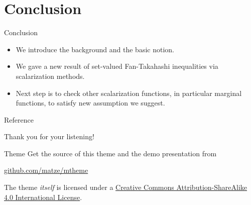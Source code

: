 \documentclass[aspectratio=169, dvipdfmx, 11pt]{beamer}
\begin{document}
\section{Conclusion}

\begin{frame}{Conclusion}
  \begin{itemize}
    \item We introduce the background and the basic notion.
    \item We gave a new result of set-valued Fan-Takahashi inequalities via scalarization methods.
    \item Next step is to check other scalarization functions, in particular marginal functions,
          to satisfy new assumption we suggest.
  \end{itemize}
\end{frame}

\begin{frame}[allowframebreaks]{Reference}
  \printbibliography
\end{frame}

\begin{frame}
  Thank you for your listening!
\end{frame}

\begin{frame}[noframenumbering]{Theme}
  Get the source of this theme and the demo presentation from

  \begin{center}\url{github.com/matze/mtheme}\end{center}

  The theme \emph{itself} is licensed under a
  \href{http://creativecommons.org/licenses/by-sa/4.0/}{Creative Commons
    Attribution-ShareAlike 4.0 International License}.

  \begin{center}\ccbysa\end{center}
\end{frame}
\end{document}
